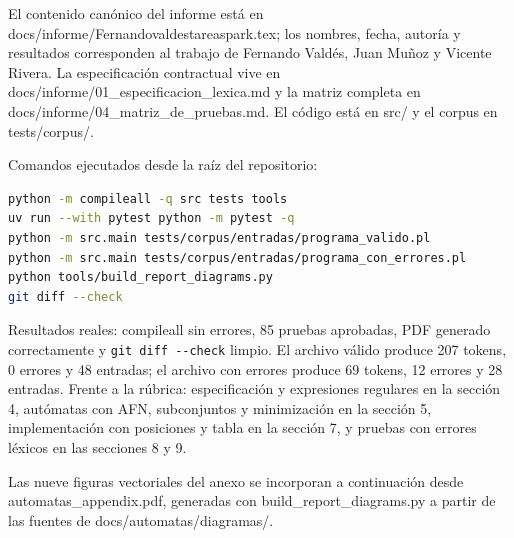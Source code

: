 \documentclass[11pt,letterpaper]{article}
\newcommand{\code}[1]{{\ttfamily\small #1}}
\begin{document}
El contenido canónico del informe está en \code{docs/informe/Fernandovaldestareaspark.tex}; los nombres, fecha, autoría y resultados corresponden al trabajo de Fernando Valdés, Juan Muñoz y Vicente Rivera. La especificación contractual vive en \code{docs/informe/01\_especificacion\_lexica.md} y la matriz completa en \code{docs/informe/04\_matriz\_de\_pruebas.md}. El código está en \code{src/} y el corpus en \code{tests/corpus/}.

Comandos ejecutados desde la raíz del repositorio:

\begin{lstlisting}[language=bash]
python -m compileall -q src tests tools
uv run --with pytest python -m pytest -q
python -m src.main tests/corpus/entradas/programa_valido.pl
python -m src.main tests/corpus/entradas/programa_con_errores.pl
python tools/build_report_diagrams.py
git diff --check
\end{lstlisting}

Resultados reales: \code{compileall} sin errores, 85 pruebas aprobadas, PDF generado correctamente y \lstinline|git diff --check| limpio. El archivo válido produce 207 tokens, 0 errores y 48 entradas; el archivo con errores produce 69 tokens, 12 errores y 28 entradas. Frente a la rúbrica: especificación y expresiones regulares en la sección 4, autómatas con AFN, subconjuntos y minimización en la sección 5, implementación con posiciones y tabla en la sección 7, y pruebas con errores léxicos en las secciones 8 y 9.

Las nueve figuras vectoriales del anexo se incorporan a continuación desde \code{automatas\_appendix.pdf}, generadas con \code{build\_report\_diagrams.py} a partir de las fuentes de \code{docs/automatas/diagramas/}.

\clearpage

\end{document}
